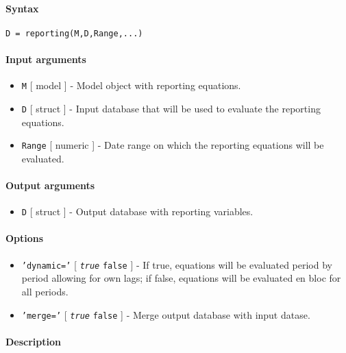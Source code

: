 


	\paragraph{Syntax}\label{syntax}

\begin{verbatim}
D = reporting(M,D,Range,...)
\end{verbatim}

\paragraph{Input arguments}\label{input-arguments}

\begin{itemize}
\item
  \texttt{M} {[} model {]} - Model object with reporting equations.
\item
  \texttt{D} {[} struct {]} - Input database that will be used to
  evaluate the reporting equations.
\item
  \texttt{Range} {[} numeric {]} - Date range on which the reporting
  equations will be evaluated.
\end{itemize}

\paragraph{Output arguments}\label{output-arguments}

\begin{itemize}
\itemsep1pt\parskip0pt
\item
  \texttt{D} {[} struct {]} - Output database with reporting variables.
\end{itemize}

\paragraph{Options}\label{options}

\begin{itemize}
\item
  \texttt{'dynamic='} {[} \emph{\texttt{true}} \textbar{} \texttt{false}
  {]} - If true, equations will be evaluated period by period allowing
  for own lags; if false, equations will be evaluated en bloc for all
  periods.
\item
  \texttt{'merge='} {[} \emph{\texttt{true}} \textbar{} \texttt{false}
  {]} - Merge output database with input datase.
\end{itemize}

\paragraph{Description}\label{description}


